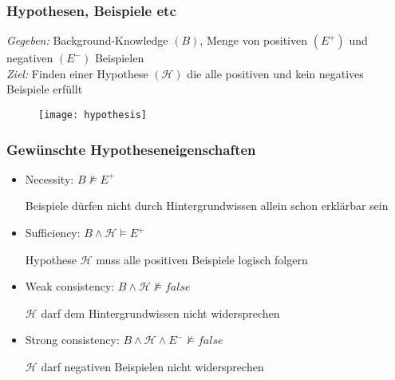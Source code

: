 \begin{frame}
\frametitle{Hypothesen, Beispiele etc}
	\emph{Gegeben:} Background-Knowledge $(B)$, Menge von positiven $(E^+)$ und negativen $(E^-)$ Beispielen\\
	\emph{Ziel:} Finden einer Hypothese $(\mathcal{H})$ die alle positiven und kein negatives Beispiele erfüllt
\begin{figure}[H]
	\centering
	\texttt{[image: hypothesis]}
\end{figure}
\end{frame}

\begin{frame}
	\frametitle{Gewünschte Hypotheseneigenschaften}
	\begin{itemize}
		\item Necessity:          $B \nvDash E^{+}$

			Beispiele dürfen nicht durch Hintergrundwissen allein schon erklärbar sein

		\item Sufficiency:        $B \wedge \mathcal{H} \vDash E^{+}$

			Hypothese $\mathcal{H}$ muss alle positiven Beispiele logisch folgern

		\item Weak consistency:   $B \wedge \mathcal{H} \nvDash false$

			$\mathcal{H}$ darf dem Hintergrundwissen nicht widersprechen

		\item Strong consistency: $B \wedge \mathcal{H} \wedge E^{-} \nvDash false$

			$\mathcal{H}$ darf negativen Beispielen nicht widersprechen
	\end{itemize}
\end{frame}
